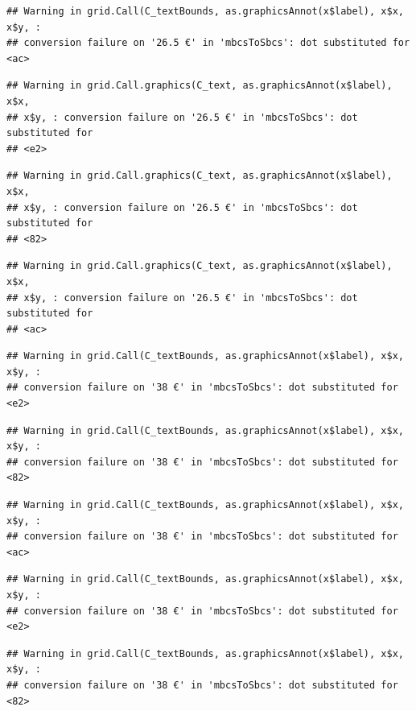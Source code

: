 \documentclass[]{gitbook}
\begin{document}
\begin{verbatim}
## Warning in grid.Call(C_textBounds, as.graphicsAnnot(x$label), x$x, x$y, :
## conversion failure on '26.5 €' in 'mbcsToSbcs': dot substituted for <ac>
\end{verbatim}

\begin{verbatim}
## Warning in grid.Call.graphics(C_text, as.graphicsAnnot(x$label), x$x,
## x$y, : conversion failure on '26.5 €' in 'mbcsToSbcs': dot substituted for
## <e2>
\end{verbatim}

\begin{verbatim}
## Warning in grid.Call.graphics(C_text, as.graphicsAnnot(x$label), x$x,
## x$y, : conversion failure on '26.5 €' in 'mbcsToSbcs': dot substituted for
## <82>
\end{verbatim}

\begin{verbatim}
## Warning in grid.Call.graphics(C_text, as.graphicsAnnot(x$label), x$x,
## x$y, : conversion failure on '26.5 €' in 'mbcsToSbcs': dot substituted for
## <ac>
\end{verbatim}

\begin{verbatim}
## Warning in grid.Call(C_textBounds, as.graphicsAnnot(x$label), x$x, x$y, :
## conversion failure on '38 €' in 'mbcsToSbcs': dot substituted for <e2>
\end{verbatim}

\begin{verbatim}
## Warning in grid.Call(C_textBounds, as.graphicsAnnot(x$label), x$x, x$y, :
## conversion failure on '38 €' in 'mbcsToSbcs': dot substituted for <82>
\end{verbatim}

\begin{verbatim}
## Warning in grid.Call(C_textBounds, as.graphicsAnnot(x$label), x$x, x$y, :
## conversion failure on '38 €' in 'mbcsToSbcs': dot substituted for <ac>
\end{verbatim}

\begin{verbatim}
## Warning in grid.Call(C_textBounds, as.graphicsAnnot(x$label), x$x, x$y, :
## conversion failure on '38 €' in 'mbcsToSbcs': dot substituted for <e2>
\end{verbatim}

\begin{verbatim}
## Warning in grid.Call(C_textBounds, as.graphicsAnnot(x$label), x$x, x$y, :
## conversion failure on '38 €' in 'mbcsToSbcs': dot substituted for <82>
\end{verbatim}
\end{document}
